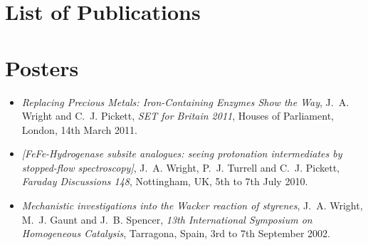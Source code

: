 \documentclass[11pt,draft]{article}
\begin{document}
\newpage

\section{List of Publications}



\section{Posters}

\begin{itemize}
  \item \emph{Replacing Precious Metals: Iron-Containing Enzymes Show
    the Way}, J.~A. Wright and C.~J. Pickett, \emph{SET for Britain
    2011}, Houses of Parliament, London, 14th March 2011.
    
  \item \emph{[FeFe-Hydrogenase subsite analogues: seeing protonation
    intermediates by stopped-flow spectroscopy]}, J.~A. Wright,
    P.~J. Turrell and C.~J. Pickett, \emph{Faraday Discussions 148},
    Nottingham, UK, 5th to 7th July 2010.
    
  \item \emph{Mechanistic investigations into the Wacker reaction of
    styrenes}, J.~A. Wright, M.~J. Gaunt and J.~B. Spencer,
    \emph{13th International Symposium on Homogeneous Catalysis},
    Tarragona, Spain, 3rd to 7th September 2002.
\end{itemize}
\end{document}

